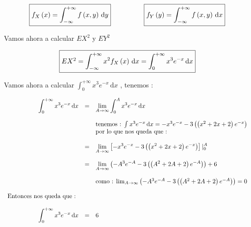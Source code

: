 \documentclass[12pt]{article}
\begin{document}
    \begin{equation*}
        \begin{array}{cp{1cm}c}
            \fbox{$
            f_X\left(x\right) =\displaystyle  \int_{-\infty}^{+\infty} f\left(x,y\right) \,\mathrm{d}y
            $}
            &
            &
            \fbox{$
            f_Y\left(y\right) =\displaystyle  \int_{-\infty}^{+\infty} f\left(x,y\right) \,\mathrm{d}x
            $}
        \end{array}
    \end{equation*}


    \vspace{1cm}

    \begin{flushleft}
        Vamos ahora a calcular $EX^2 $ y $EY^2$  
    \end{flushleft}

    \begin{equation*}
        \fbox{$
            EX^2 = \displaystyle \int_{-\infty}^{+\infty}  x^2 f_{X}\left(x\right) \,\mathrm{d}x  = \displaystyle \int_{0}^{+\infty}  x^3 e^{-x} \,\mathrm{d}x
        $}
    \end{equation*}

    \begin{flushleft}
        Vamos ahora a calcular $\int_{0}^{+\infty}  x^3 e^{-x} \,\mathrm{d}x$ , tenemos : 
    \end{flushleft}
    \begin{equation*}
        \begin{array}{rcl}
            \displaystyle \int_{0}^{+\infty}  x^3 e^{-x} \,\mathrm{d}x & = & \displaystyle \lim_{A \to \infty}  \int_{0}^{A}  x^3 e^{-x} \,\mathrm{d}x
            \\
            \\
            && \mbox{tenemos : $ \int_{}^{}  x^3 e^{-x} \,\mathrm{d}x = - x^3e^{-x} - 3 \left(\left(x^2+ 2x + 2\right)e^{-x}\right)$} 
            \\
            && \mbox{por lo que nos queda que :}
            \\
            \\
            & = &\displaystyle \lim_{A \to \infty}  \left[- x^3e^{-x} - 3 \left(\left(x^2+ 2x + 2\right)e^{-x}\right)\right] \vert_{0}^{A}
            \\
            \\
            & = & \displaystyle \lim_{A \to \infty}  \left(- A^3e^{-A} - 3 \left(\left(A^2+ 2A + 2\right)e^{-A}\right)\right) + 6 
            \\
            \\
            && \mbox{como : $\lim_{A \to \infty}  \left(- A^3e^{-A} - 3 \left(\left(A^2+ 2A + 2\right)e^{-A}\right)\right) = 0 $}
            \\
            \\
            \mbox{Entonces nos queda que : }&&
            \\
            \\
            \displaystyle \int_{0}^{+\infty}  x^3 e^{-x} \,\mathrm{d}x & = & 6
        \end{array}
    \end{equation*}
\end{document}
